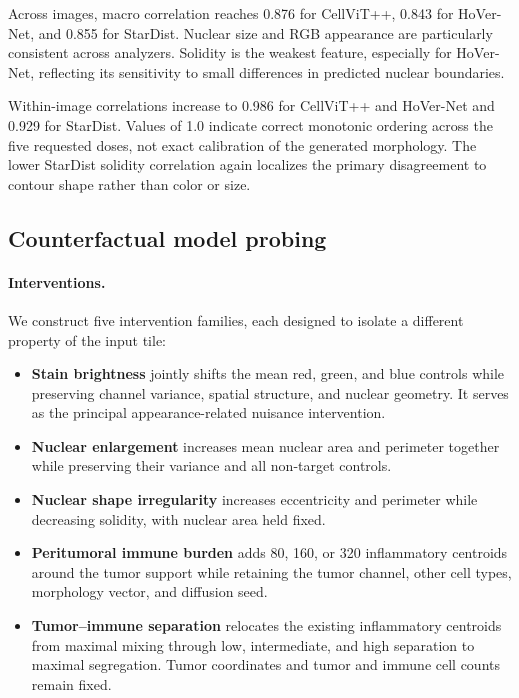 Across images, macro correlation reaches 0.876 for CellViT++, 0.843 for HoVer-Net, and 0.855 for StarDist. Nuclear size and RGB appearance are particularly consistent across analyzers. Solidity is the weakest feature, especially for HoVer-Net, reflecting its sensitivity to small differences in predicted nuclear boundaries.

Within-image correlations increase to 0.986 for CellViT++ and HoVer-Net and 0.929 for StarDist. Values of 1.0 indicate correct monotonic ordering across the five requested doses, not exact calibration of the generated morphology. The lower StarDist solidity correlation again localizes the primary disagreement to contour shape rather than color or size.

\subsection{Counterfactual model probing}
\label{sec:counterfactual-probing}

\paragraph{Interventions.}
We construct five intervention families, each designed to isolate a different property of the input tile:

\begin{itemize}
    \item \textbf{Stain brightness} jointly shifts the mean red, green, and blue controls while preserving channel variance, spatial structure, and nuclear geometry. It serves as the principal appearance-related nuisance intervention.
    \item \textbf{Nuclear enlargement} increases mean nuclear area and perimeter together while preserving their variance and all non-target controls.
    \item \textbf{Nuclear shape irregularity} increases eccentricity and perimeter while decreasing solidity, with nuclear area held fixed.
    \item \textbf{Peritumoral immune burden} adds 80, 160, or 320 inflammatory centroids around the tumor support while retaining the tumor channel, other cell types, morphology vector, and diffusion seed.
    \item \textbf{Tumor--immune separation} relocates the existing inflammatory centroids from maximal mixing through low, intermediate, and high separation to maximal segregation. Tumor coordinates and tumor and immune cell counts remain fixed.
\end{itemize}

